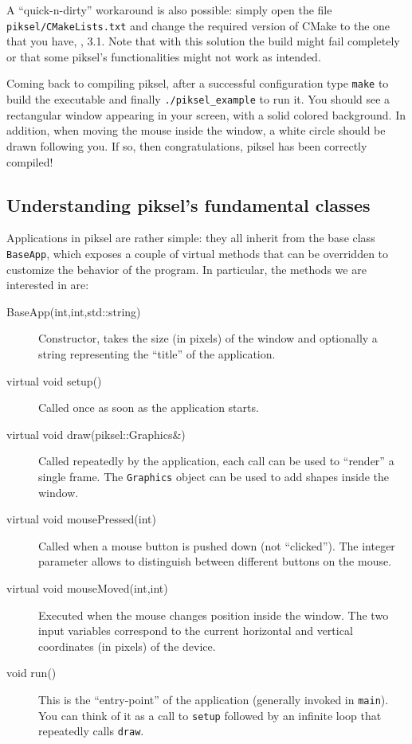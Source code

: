 \documentclass{article}
\begin{document}
A ``quick-n-dirty'' workaround is also possible: simply open the file \texttt{piksel/CMakeLists.txt} and change the required version of CMake to the one that you have, \eg, 3.1. Note that with this solution the build might fail completely or that some piksel's functionalities might not work as intended.

Coming back to compiling piksel, after a successful configuration type \texttt{make} to build the executable and finally \texttt{./piksel\string_example} to run it. You should see a rectangular window appearing in your screen, with a solid colored background. In addition, when moving the mouse inside the window, a white circle should be drawn following you. If so, then congratulations, piksel has been correctly compiled!




\subsection{Understanding piksel's fundamental classes}

Applications in piksel are rather simple: they all inherit from the base class \texttt{BaseApp}, which exposes a couple of virtual methods that can be overridden to customize the behavior of the program. In particular, the methods we are interested in are:

\begin{description}
  \item[\ttfamily BaseApp(int,int,std::string)] Constructor, takes the size (in pixels) of the window and optionally a string representing the ``title'' of the application.
  \item[\ttfamily virtual void setup()] Called once as soon as the application starts.
  \item[\ttfamily virtual void draw(piksel::Graphics\&)] Called repeatedly by the application, each call can be used to ``render'' a single frame. The \texttt{Graphics} object can be used to add shapes inside the window.
  \item[\ttfamily virtual void mousePressed(int)] Called when a mouse button is pushed down (not ``clicked''). The integer parameter allows to distinguish between different buttons on the mouse.
  \item[\ttfamily virtual void mouseMoved(int,int)] Executed when the mouse changes position inside the window. The two input variables correspond to the current horizontal and vertical coordinates (in pixels) of the device.
  \item[void run()] This is the ``entry-point'' of the application (generally invoked in \texttt{main}). You can think of it as a call to \texttt{setup} followed by an infinite loop that repeatedly calls \texttt{draw}.
\end{description}
\end{document}
